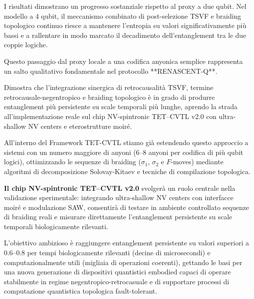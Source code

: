 \documentclass[11pt,a4paper]{article}
\theoremstyle{plain}
\theoremstyle{definition}
\begin{document}
\vspace{0.2cm}

I risultati dimostrano un progresso sostanziale rispetto al proxy a due qubit. Nel modello a 4 qubit, il meccanismo combinato di post-selezione TSVF e braiding topologico continuo riesce a mantenere l'entropia su valori significativamente più bassi e a rallentare in modo marcato il decadimento dell'entanglement tra le due coppie logiche. 


\vspace{0.3cm}

Questo passaggio dal proxy locale a una codifica anyonica semplice rappresenta un salto qualitativo fondamentale nel protocollo **RENASCENT-Q**. 



\vspace{0.3cm}


Dimostra che l'integrazione sinergica di retrocausalità TSVF, termine retrocausale-negentropico e braiding topologico è in grado di produrre entanglement più persistente su scale temporali più lunghe, aprendo la strada all'implementazione reale sul chip NV-spintronic TET–CVTL v2.0 con ultra-shallow NV centers e eterostrutture moiré.

\vspace{0.4cm}

All'interno del Framework TET-CVTL stiamo già estendendo questo approccio a sistemi con un numero maggiore di anyoni (6–8 anyoni per codifica di più qubit logici), ottimizzando le sequenze di braiding ($\sigma_1$, $\sigma_2$ e $F$-moves) mediante algoritmi di decomposizione Solovay-Kitaev e tecniche di compilazione topologica. 


\vspace{0.5cm}


\textbf{Il chip NV-spintronic TET–CVTL v2.0} svolgerà un ruolo centrale nella validazione sperimentale: integrando ultra-shallow NV centers con interfacce moiré e modulazione SAW, consentirà di testare in ambiente controllato sequenze di braiding reali e misurare direttamente l'entanglement persistente su scale temporali biologicamente rilevanti. 

\vspace{0.3cm}

L'obiettivo ambizioso è raggiungere entanglement persistente su valori superiori a 0.6–0.8 per tempi biologicamente rilevanti (decine di microsecondi) e computazionalmente utili (migliaia di operazioni coerenti), gettando le basi per una nuova generazione di dispositivi quantistici embodied capaci di operare stabilmente in regime negentropico-retrocasuale e di supportare processi di computazione quantistica topologica fault-tolerant.
\end{document}
